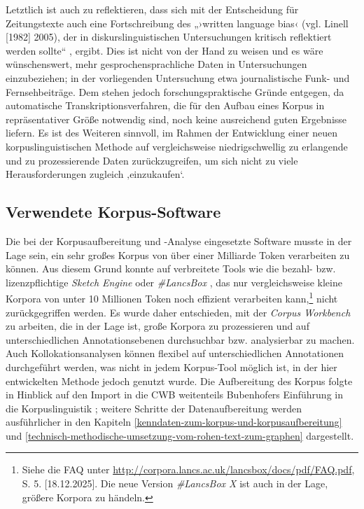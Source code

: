 Letztlich ist auch zu reflektieren, dass sich mit der Entscheidung für Zeitungstexte auch eine Fortschreibung des „›written language bias‹ (vgl. Linell {[}1982{]} 2005), der in diskurslinguistischen Untersuchungen kritisch reflektiert werden sollte`` \autocite[39]{spitzmullerDiskurslinguistikEinfuhrungTheorien2011}, ergibt. Dies ist nicht von der Hand zu weisen und es wäre wünschenswert, mehr gesprochensprachliche Daten in Untersuchungen einzubeziehen; in der vorliegenden Untersuchung etwa journalistische Funk- und Fernsehbeiträge. Dem stehen jedoch forschungspraktische Gründe entgegen, da automatische Transkriptionsverfahren, die für den Aufbau eines Korpus in repräsentativer Größe notwendig sind, noch keine ausreichend guten Ergebnisse liefern. Es ist des Weiteren sinnvoll, im Rahmen der Entwicklung einer neuen korpuslinguistischen Methode auf vergleichsweise niedrigschwellig zu erlangende und zu prozessierende Daten zurückzugreifen, um sich nicht zu viele Herausforderungen zugleich ‚einzukaufen`.

\subsection{Verwendete Korpus-Software}\label{verwendete-korpus-software}

Die bei der Korpusaufbereitung und -Analyse eingesetzte Software musste in der Lage sein, ein sehr großes Korpus von über einer Milliarde Token verarbeiten zu können. Aus diesem Grund konnte auf verbreitete Tools wie die bezahl- bzw. lizenzpflichtige \emph{Sketch Engine} \autocite{kilgarriffSketchEngineTen2014} oder \emph{\#LancsBox} \autocite{brezinaLancsBoxV5x2020}, das nur vergleichsweise kleine Korpora von unter 10 Millionen Token noch effizient verarbeiten kann,\footnote{Siehe die FAQ unter \url{http://corpora.lancs.ac.uk/lancsbox/docs/pdf/FAQ.pdf}, S. 5. {[}18.12.2025{]}. Die neue Version \emph{\#LancsBox X} \autocite{brezinaLancsBox2023} ist auch in der Lage, größere Korpora zu händeln.} nicht zurückgegriffen werden. Es wurde daher entschieden, mit der \emph{Corpus Workbench} \autocite[CWB,][]{evertTwentyfirstCenturyCorpus2011} zu arbeiten, die in der Lage ist, große Korpora zu prozessieren und auf unterschiedlichen Annotationsebenen durchsuchbar bzw. analysierbar zu machen. Auch Kollokationsanalysen können flexibel auf unterschiedlichen Annotationen durchgeführt werden, was nicht in jedem Korpus-Tool möglich ist, in der hier entwickelten Methode jedoch genutzt wurde. Die Aufbereitung des Korpus folgte in Hinblick auf den Import in die CWB weitenteils Bubenhofers Einführung in die Korpuslinguistik \autocite*{bubenhoferEinfuhrungKorpuslinguistikPraktische2006}; weitere Schritte der Datenaufbereitung werden ausführlicher in den Kapiteln \ref{kenndaten-zum-korpus-und-korpusaufbereitung} und \ref{technisch-methodische-umsetzung-vom-rohen-text-zum-graphen} dargestellt.

